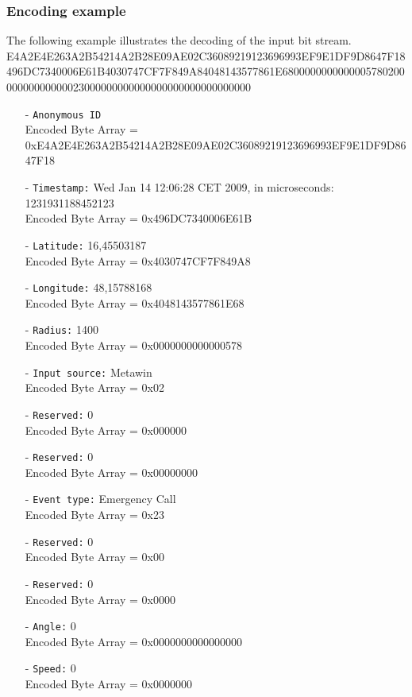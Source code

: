 \subsubsection{Encoding example}
The following example illustrates the decoding of the input bit stream.\\
E4A2E4E263A2B54214A2B28E09AE02C36089219123696993EF9E1DF9D8647F18\\
496DC7340006E61B4030747CF7F849A84048143577861E6800000000000005780200\\
00000000000023000000000000000000000000000000
\begin{itemize}
	\item[-] \verb+Anonymous ID+
	      \\Encoded Byte Array = 0xE4A2E4E263A2B54214A2B28E09\-AE02C360\-89219123696993EF9E1DF9D8647F18
	\item[-] \verb|Timestamp:| Wed Jan 14 12:06:28 CET 2009, in microseconds: 1231931188452123
	      \\Encoded Byte Array = 0x496DC7340006E61B
	      
	\item[-] \verb|Latitude:| 16,45503187
	      \\Encoded Byte Array = 0x4030747CF7F849A8
	\item[-] \verb|Longitude:| 48,15788168
	      \\Encoded Byte Array = 0x4048143577861E68
	\item[-] \verb|Radius:| 1400
	      \\Encoded Byte Array = 0x0000000000000578
	\item[-] \verb|Input source:| Metawin
	      \\Encoded Byte Array = 0x02
	\item[-] \verb|Reserved:| 0
	      \\Encoded Byte Array = 0x000000
	\item[-] \verb|Reserved:| 0
	      \\Encoded Byte Array = 0x00000000
	\item[-] \verb|Event type:| Emergency Call
	      \\Encoded Byte Array = 0x23
	\item[-] \verb|Reserved:| 0
	      \\Encoded Byte Array = 0x00
	\item[-] \verb|Reserved:| 0
	      \\Encoded Byte Array = 0x0000
	\item[-] \verb|Angle:| 0
	      \\Encoded Byte Array = 0x0000000000000000
	\item[-] \verb|Speed:| 0
	      \\Encoded Byte Array = 0x0000000
\end{itemize}
